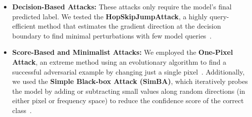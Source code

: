 \documentclass[conference]{IEEEtran}
\begin{document}
\begin{itemize}
    \item \textbf{Decision-Based Attacks:} These attacks only require the model's final predicted label. We tested the \textbf{HopSkipJumpAttack}, a highly query-efficient method that estimates the gradient direction at the decision boundary to find minimal perturbations with few model queries~\cite{chen2020hopskipjumpattackqueryefficientdecisionbasedattack}.

    \item \textbf{Score-Based and Minimalist Attacks:} We employed the \textbf{One-Pixel Attack}, an extreme method using an evolutionary algorithm to find a successful adversarial example by changing just a single pixel~\cite{Su_2019}. Additionally, we used the \textbf{Simple Black-box Attack (SimBA)}, which iteratively probes the model by adding or subtracting small values along random directions (in either pixel or frequency space) to reduce the confidence score of the correct class~\cite{guo2019simple}.
\end{itemize}
\end{document}
